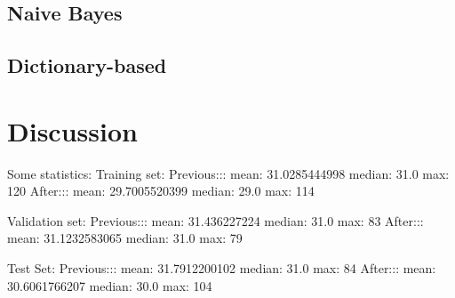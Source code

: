 \documentclass{article}
\begin{document}
\subsection{Naive Bayes}

\subsection{Dictionary-based}

\section{Discussion}

Some statistics: 
Training set:
Previous::: mean: 31.0285444998 median: 31.0 max: 120
After::: mean: 29.7005520399 median: 29.0 max: 114

Validation set:
Previous::: mean: 31.436227224 median: 31.0 max: 83
After::: mean: 31.1232583065 median: 31.0 max: 79

Test Set:
Previous::: mean: 31.7912200102 median: 31.0 max: 84
After::: mean: 30.6061766207 median: 30.0 max: 104
\end{document}
